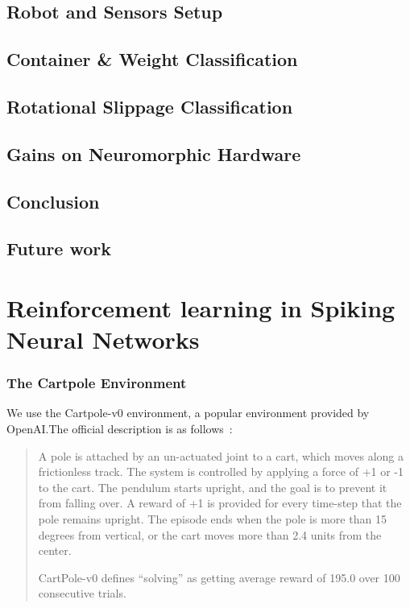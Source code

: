 \documentclass[fyp]{socreport}
\begin{document}
\section{Robot and Sensors Setup\label{sec:snnrl_exp_setup}}

\section{Container \& Weight Classification\label{sec:snnrl_container_class}}

\section{Rotational Slippage Classification\label{sec:snnrl_slippage}}

\section{Gains on Neuromorphic Hardware\label{sec:snnrl_neuromorphic}}

\section{Conclusion\label{sec:snnrl_conclusion}}

\section{Future work\label{sec:snnrl_future_work}}

\chapter{Reinforcement learning in Spiking Neural Networks\label{cha:snnrl}}


\subsection{The Cartpole Environment}


We use the Cartpole-v0 environment, a popular environment provided by
OpenAI.\@ The official description is as follows~\cite{openai_gym}:

\begin{quote} A pole is attached by an un-actuated joint to a cart, which moves
along a frictionless track. The system is controlled by applying a force of +1
or -1 to the cart. The pendulum starts upright, and the goal is to prevent it
from falling over. A reward of +1 is provided for every time-step that the pole
remains upright. The episode ends when the pole is more than 15 degrees from
vertical, or the cart moves more than 2.4 units from the center.

CartPole-v0 defines ``solving'' as getting average reward of 195.0 over 100
consecutive trials.
\end{quote}
\end{document}

